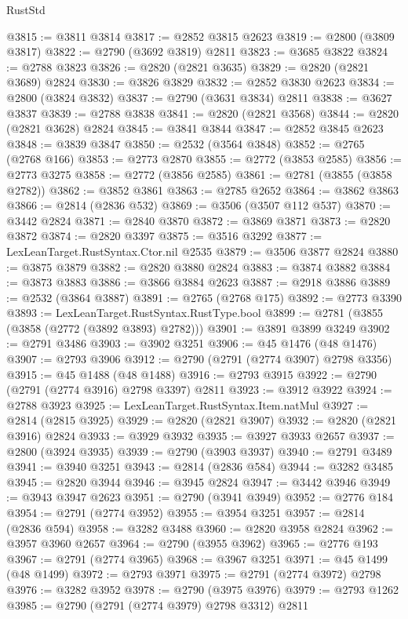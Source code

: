 \begin{lexlean}{RustStd}
\begin{coremodule}
@3815 := @3811 @3814
@3817 := @2852 @3815 @2623
@3819 := @2800 (@3809 @3817)
@3822 := @2790 (@3692 @3819) @2811
@3823 := @3685 @3822
@3824 := @2788 @3823
@3826 := @2820 (@2821 @3635)
@3829 := @2820 (@2821 @3689) @2824
@3830 := @3826 @3829
@3832 := @2852 @3830 @2623
@3834 := @2800 (@3824 @3832)
@3837 := @2790 (@3631 @3834) @2811
@3838 := @3627 @3837
@3839 := @2788 @3838
@3841 := @2820 (@2821 @3568)
@3844 := @2820 (@2821 @3628) @2824
@3845 := @3841 @3844
@3847 := @2852 @3845 @2623
@3848 := @3839 @3847
@3850 := @2532 (@3564 @3848)
@3852 := @2765 (@2768 @166)
@3853 := @2773 @2870
@3855 := @2772 (@3853 @2585)
@3856 := @2773 @3275
@3858 := @2772 (@3856 @2585)
@3861 := @2781 (@3855 (@3858 @2782))
@3862 := @3852 @3861
@3863 := @2785 @2652
@3864 := @3862 @3863
@3866 := @2814 (@2836 @532)
@3869 := @3506 (@3507 @112 @537)
@3870 := @3442 @2824
@3871 := @2840 @3870
@3872 := @3869 @3871
@3873 := @2820 @3872
@3874 := @2820 @3397
@3875 := @3516 @3292
@3877 := LexLeanTarget.RustSyntax.Ctor.nil @2535
@3879 := @3506 @3877 @2824
@3880 := @3875 @3879
@3882 := @2820 @3880 @2824
@3883 := @3874 @3882
@3884 := @3873 @3883
@3886 := @3866 @3884 @2623
@3887 := @2918 @3886
@3889 := @2532 (@3864 @3887)
@3891 := @2765 (@2768 @175)
@3892 := @2773 @3390
@3893 := LexLeanTarget.RustSyntax.RustType.bool
@3899 := @2781 (@3855 (@3858 (@2772 (@3892 @3893) @2782)))
@3901 := @3891 @3899 @3249
@3902 := @2791 @3486
@3903 := @3902 @3251
@3906 := @45 @1476 (@48 @1476)
@3907 := @2793 @3906
@3912 := @2790 (@2791 (@2774 @3907) @2798 @3356)
@3915 := @45 @1488 (@48 @1488)
@3916 := @2793 @3915
@3922 := @2790 (@2791 (@2774 @3916) @2798 @3397) @2811
@3923 := @3912 @3922
@3924 := @2788 @3923
@3925 := LexLeanTarget.RustSyntax.Item.natMul
@3927 := @2814 (@2815 @3925)
@3929 := @2820 (@2821 @3907)
@3932 := @2820 (@2821 @3916) @2824
@3933 := @3929 @3932
@3935 := @3927 @3933 @2657
@3937 := @2800 (@3924 @3935)
@3939 := @2790 (@3903 @3937)
@3940 := @2791 @3489
@3941 := @3940 @3251
@3943 := @2814 (@2836 @584)
@3944 := @3282 @3485
@3945 := @2820 @3944
@3946 := @3945 @2824
@3947 := @3442 @3946
@3949 := @3943 @3947 @2623
@3951 := @2790 (@3941 @3949)
@3952 := @2776 @184
@3954 := @2791 (@2774 @3952)
@3955 := @3954 @3251
@3957 := @2814 (@2836 @594)
@3958 := @3282 @3488
@3960 := @2820 @3958 @2824
@3962 := @3957 @3960 @2657
@3964 := @2790 (@3955 @3962)
@3965 := @2776 @193
@3967 := @2791 (@2774 @3965)
@3968 := @3967 @3251
@3971 := @45 @1499 (@48 @1499)
@3972 := @2793 @3971
@3975 := @2791 (@2774 @3972) @2798
@3976 := @3282 @3952
@3978 := @2790 (@3975 @3976)
@3979 := @2793 @1262
@3985 := @2790 (@2791 (@2774 @3979) @2798 @3312) @2811

\end{coremodule}
\end{lexlean}
